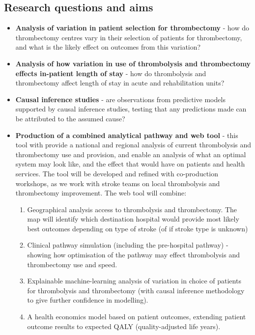 \subsection{Research questions and aims}

\begin{itemize}
    \item \textbf{Analysis of variation in patient selection for thrombectomy} - how do thrombectomy centres vary in their selection of patients for thrombectomy, and what is the likely effect on outcomes from this variation?

    \item \textbf{Analysis of how variation in use of thrombolysis and thrombectomy effects in-patient length of stay} - how do thrombolysis and thrombectomy affect length of stay in acute and rehabilitation units?

    \item \textbf{Causal inference studies} - are observations from predictive models supported by causal inference studies, testing that any predictions made can be attributed to the assumed cause?

    \item \textbf{Production of a combined analytical pathway and web tool} - this tool with provide a national and regional analysis of current thrombolysis and thrombectomy use and provision, and enable an analysis of what an optimal system may look like, and the effect that would have on patients and health services. The tool will be developed and refined with co-production workshops, as we work with stroke teams on local thrombolysis and thrombectomy improvement. The web tool will combine:
    
    \begin{enumerate}
        \item Geographical analysis access to thrombolysis and thrombectomy. The map will identify which destination hospital would provide most likely best outcomes depending on type of stroke (of if stroke type is unknown)

        \item Clinical pathway simulation (including the pre-hospital pathway) - showing how optimisation of the pathway may effect thrombolysis and thrombectomy use and speed.

        \item Explainable machine-learning analysis of variation in choice of patients for thrombolysis and thrombectomy (with causal inference methodology to give further confidence in modelling).

        \item A health economics model based on patient outcomes, extending patient outcome results to expected QALY (quality-adjusted life years).
    \end{enumerate} 
    
\end{itemize}

